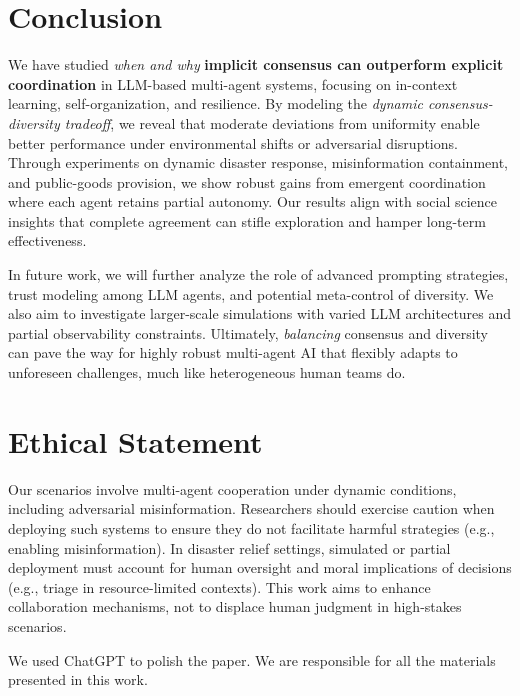 \section{Conclusion}
We have studied \emph{when and why} \textbf{implicit consensus can outperform explicit coordination} in LLM-based multi-agent systems, focusing on in-context learning, self-organization, and resilience. By modeling the \emph{dynamic consensus-diversity tradeoff}, we reveal that moderate deviations from uniformity enable better performance under environmental shifts or adversarial disruptions. Through experiments on dynamic disaster response, misinformation containment, and public-goods provision, we show robust gains from emergent coordination where each agent retains partial autonomy. Our results align with social science insights that complete agreement can stifle exploration and hamper long-term effectiveness.

In future work, we will further analyze the role of advanced prompting strategies, trust modeling among LLM agents, and potential meta-control of diversity. We also aim to investigate larger-scale simulations with varied LLM architectures and partial observability constraints. Ultimately, \emph{balancing} consensus and diversity can pave the way for highly robust multi-agent AI that flexibly adapts to unforeseen challenges, much like heterogeneous human teams do.

\section*{Ethical Statement}
Our scenarios involve multi-agent cooperation under dynamic conditions, including adversarial misinformation. Researchers should exercise caution when deploying such systems to ensure they do not facilitate harmful strategies (e.g., enabling misinformation). In disaster relief settings, simulated or partial deployment must account for human oversight and moral implications of decisions (e.g., triage in resource-limited contexts). This work aims to enhance collaboration mechanisms, not to displace human judgment in high-stakes scenarios.

We used ChatGPT to polish the paper. We are responsible for all the materials presented in this work.

